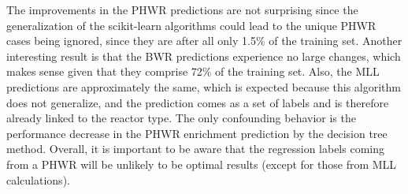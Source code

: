 The improvements in the \gls{PHWR} predictions are not surprising since the
generalization of the scikit-learn algorithms could lead to the unique
\gls{PHWR} cases being ignored, since they are after all only 1.5\% of the
training set.  Another interesting result is that the \gls{BWR} predictions
experience no large changes, which makes sense given that they comprise 72\% of
the training set. Also, the \gls{MLL} predictions are approximately the same,
which is expected because this algorithm does not generalize, and the
prediction comes as a set of labels and is therefore already linked to the
reactor type.  The only confounding behavior is the performance decrease in the
\gls{PHWR} enrichment prediction by the decision tree method.  Overall, it is
important to be aware that the regression labels coming from a \gls{PHWR} will
be unlikely to be optimal results (except for those from \gls{MLL}
calculations).

